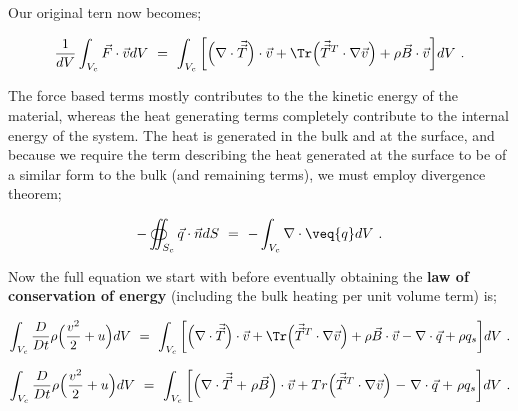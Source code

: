 \documentclass{article}
\begin{document}
Our original tern now becomes;

\begin{equation} \label{eq:1}
\frac{1}{dV} \int_{V_c} \vec{F} \cdot \vec{v} dV \hspace{0.125cm} = \hspace{0.125cm} \int_{V_c} \bigg[ \Big( \nabla \cdot \vec{\vec{T}} \Big) \cdot \vec{v} + \Tr \Big( \vec{\vec{T}}^T \cdot \nabla{\vec{v}} \Big) + \rho \vec{B} \cdot \vec{v} \bigg]  dV \hspace{0.125cm}  . 
\end{equation}

The force based terms mostly contributes to the the kinetic energy of the material, whereas the heat generating terms completely contribute to the internal energy of the system. The heat is generated in the bulk and at the surface, and because we require the term describing the heat generated at the surface to be of a similar form to the bulk (and remaining terms), we must employ divergence theorem;

\begin{equation} \label{eq:1}
- \oiint_{S_c} \vec{q} \cdot \vec{n} dS \hspace{0.125cm} = \hspace{0.125cm} - \int_{V_c} \nabla \cdot \veq{q} dV \hspace{0.125cm}  . 
\end{equation}

Now the full equation we start with before eventually obtaining the \textbf{law of conservation of energy} (including the bulk heating per unit volume term) is;

\begin{equation} \label{eq:1}
\int_{V_c} \frac{D}{D t} \rho \Big( \frac{v^2}{2} + u \Big) dV \hspace{0.125cm} = \hspace{0.125cm} \int_{V_c} \bigg[ \Big( \nabla \cdot \vec{\vec{T}} \Big) \cdot \vec{v} + \Tr \Big( \vec{\vec{T}}^T \cdot \nabla{\vec{v}} \Big) + \rho \vec{B} \cdot \vec{v} - \nabla \cdot \vec{q} + \rho q_s \bigg] dV  \hspace{0.125cm}  . 
\end{equation}

\begin{equation} \label{eq:1}
\int_{V_c} \frac{D}{D t} \rho \Big( \frac{v^2}{2} + u \Big) dV \hspace{0.125cm} = \hspace{0.125cm} \int_{V_c} \bigg[ \Big( \nabla \cdot \vec{\vec{T}} \hspace{0.025cm} + \hspace{0.025cm} \rho \vec{B} \Big) \cdot \vec{v}  + Tr \Big( \vec{\vec{T}}^T \cdot \nabla{\vec{v}} \Big) \hspace{0.025cm} - \hspace{0.025cm} \nabla \cdot \vec{q} \hspace{0.025cm} + \hspace{0.025cm} \rho q_s \bigg] dV  \hspace{0.125cm}  . 
\end{equation}
\end{document}
